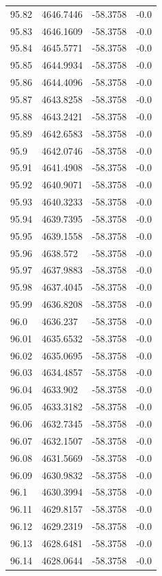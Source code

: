 \begin{table}[H]
\begin{tabular}{llll}
95.82 & 4646.7446 & -58.3758 & -0.0 \\
95.83 & 4646.1609 & -58.3758 & -0.0 \\
95.84 & 4645.5771 & -58.3758 & -0.0 \\
95.85 & 4644.9934 & -58.3758 & -0.0 \\
95.86 & 4644.4096 & -58.3758 & -0.0 \\
95.87 & 4643.8258 & -58.3758 & -0.0 \\
95.88 & 4643.2421 & -58.3758 & -0.0 \\
95.89 & 4642.6583 & -58.3758 & -0.0 \\
95.9 & 4642.0746 & -58.3758 & -0.0 \\
95.91 & 4641.4908 & -58.3758 & -0.0 \\
95.92 & 4640.9071 & -58.3758 & -0.0 \\
95.93 & 4640.3233 & -58.3758 & -0.0 \\
95.94 & 4639.7395 & -58.3758 & -0.0 \\
95.95 & 4639.1558 & -58.3758 & -0.0 \\
95.96 & 4638.572 & -58.3758 & -0.0 \\
95.97 & 4637.9883 & -58.3758 & -0.0 \\
95.98 & 4637.4045 & -58.3758 & -0.0 \\
95.99 & 4636.8208 & -58.3758 & -0.0 \\
96.0 & 4636.237 & -58.3758 & -0.0 \\
96.01 & 4635.6532 & -58.3758 & -0.0 \\
96.02 & 4635.0695 & -58.3758 & -0.0 \\
96.03 & 4634.4857 & -58.3758 & -0.0 \\
96.04 & 4633.902 & -58.3758 & -0.0 \\
96.05 & 4633.3182 & -58.3758 & -0.0 \\
96.06 & 4632.7345 & -58.3758 & -0.0 \\
96.07 & 4632.1507 & -58.3758 & -0.0 \\
96.08 & 4631.5669 & -58.3758 & -0.0 \\
96.09 & 4630.9832 & -58.3758 & -0.0 \\
96.1 & 4630.3994 & -58.3758 & -0.0 \\
96.11 & 4629.8157 & -58.3758 & -0.0 \\
96.12 & 4629.2319 & -58.3758 & -0.0 \\
96.13 & 4628.6481 & -58.3758 & -0.0 \\
96.14 & 4628.0644 & -58.3758 & -0.0 \\

\end{tabular}
\end{table}
